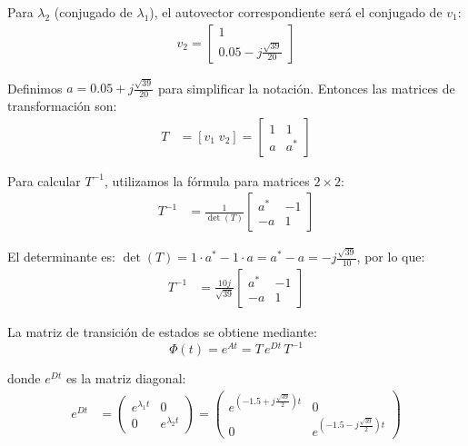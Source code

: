 \documentclass[
  11pt,
  letterpaper,
   addpoints,
  answers
  ]{exam}
\begin{document}
\begin{solution}
Para $\lambda_2$ (conjugado de $\lambda_1$), el autovector correspondiente será el conjugado de $v_1$:
\begin{align}
v_2 = \begin{bmatrix} 1 \\ 0.05 - j\frac{\sqrt{39}}{20} \end{bmatrix}
\end{align}

Definimos $a = 0.05 + j\frac{\sqrt{39}}{20}$ para simplificar la notación. Entonces las matrices de transformación son:
\begin{align}
T &= [v_1 \; v_2] = \begin{bmatrix} 1 & 1 \\ a & a^* \end{bmatrix}
\end{align}

Para calcular $T^{-1}$, utilizamos la fórmula para matrices $2 \times 2$:
\begin{align}
T^{-1} &= \frac{1}{\det(T)} \begin{bmatrix} a^* & -1 \\ -a & 1 \end{bmatrix}
\end{align}

El determinante es: $\det(T) = 1 \cdot a^* - 1 \cdot a = a^* - a = -j\frac{\sqrt{39}}{10}$, por lo que:
\begin{align}
T^{-1} &= \frac{10j}{\sqrt{39}} \begin{bmatrix} a^* & -1 \\ -a & 1 \end{bmatrix}
\end{align}

La matriz de transición de estados se obtiene mediante:
\begin{equation}
\Phi(t) = e^{At} = T\,e^{Dt}\,T^{-1}
\end{equation}

donde $e^{Dt}$ es la matriz diagonal:
\begin{align}
  e^{Dt} &= \begin{pmatrix} e^{\lambda_1 t} & 0 \\ 0 & e^{\lambda_2 t} \end{pmatrix} = \begin{pmatrix} e^{(-1.5 + j\frac{\sqrt{39}}{2})t} & 0 \\ 0 & e^{(-1.5 - j\frac{\sqrt{39}}{2})t} \end{pmatrix}
\end{align}


\end{solution}
\end{document}
